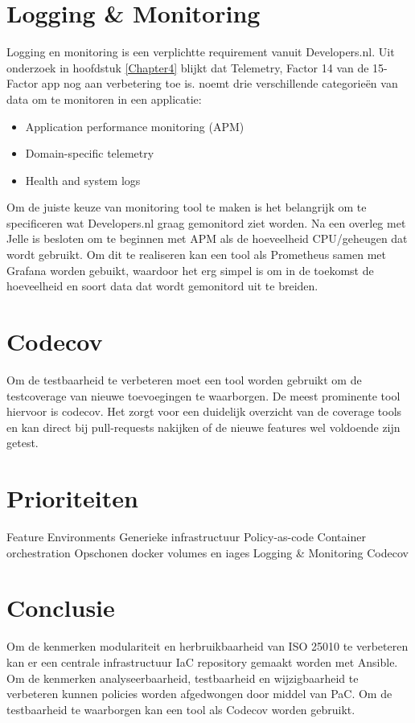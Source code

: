 \section{Logging \& Monitoring}
Logging en monitoring is een verplichtte requirement vanuit Developers.nl. Uit onderzoek in hoofdstuk \ref{Chapter4} blijkt dat Telemetry, Factor 14 van de 15-Factor app nog aan verbetering toe is. \parencite{Beyond12Factor} noemt drie verschillende categorieën van data om te monitoren in een applicatie:
\begin{itemize}
	\item Application performance monitoring (APM)
	\item Domain-specific telemetry
	\item Health and system logs
\end{itemize}

Om de juiste keuze van monitoring tool te maken is het belangrijk om te specificeren wat Developers.nl graag gemonitord ziet worden. Na een overleg met Jelle is besloten om te beginnen met APM als de hoeveelheid CPU/geheugen dat wordt gebruikt. Om dit te realiseren kan een tool als Prometheus samen met Grafana worden gebuikt, waardoor het erg simpel is om in de toekomst de hoeveelheid en soort data dat wordt gemonitord uit te breiden.

\section{Codecov}
Om de testbaarheid te verbeteren moet een tool worden gebruikt om de testcoverage van nieuwe toevoegingen te waarborgen. De meest prominente tool hiervoor is codecov. Het zorgt voor een duidelijk overzicht van de coverage tools en kan direct bij pull-requests nakijken of de nieuwe features wel voldoende zijn getest.

\section{Prioriteiten}
Feature Environments
Generieke infrastructuur
Policy-as-code
Container orchestration
Opschonen docker volumes en iages
Logging \& Monitoring
Codecov

\section{Conclusie}
Om de kenmerken modulariteit en herbruikbaarheid van ISO 25010 te verbeteren kan er een centrale infrastructuur IaC repository gemaakt worden met Ansible. Om de kenmerken analyseerbaarheid, testbaarheid en wijzigbaarheid te verbeteren kunnen policies worden afgedwongen door middel van PaC. Om de testbaarheid te waarborgen kan een tool als Codecov worden gebruikt.